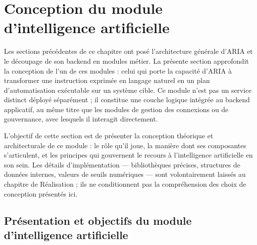 %

\section{Conception du module d'intelligence artificielle}
\label{sec:conception-ia}

Les sections précédentes de ce chapitre ont posé l'architecture générale d'ARIA et le découpage de son backend en modules métier. La présente section approfondit la conception de l'un de ces modules : celui qui porte la capacité d'ARIA à transformer une instruction exprimée en langage naturel en un plan d'automatisation exécutable sur un système cible. Ce module n'est pas un service distinct déployé séparément ; il constitue une couche logique intégrée au backend applicatif, au même titre que les modules de gestion des connexions ou de gouvernance, avec lesquels il interagit directement.

L'objectif de cette section est de présenter la conception théorique et architecturale de ce module : le rôle qu'il joue, la manière dont ses composantes s'articulent, et les principes qui gouvernent le recours à l'intelligence artificielle en son sein. Les détails d'implémentation — bibliothèques précises, structures de données internes, valeurs de seuils numériques — sont volontairement laissés au chapitre de Réalisation ; ils ne conditionnent pas la compréhension des choix de conception présentés ici.

\subsection{Présentation et objectifs du module d'intelligence artificielle}

